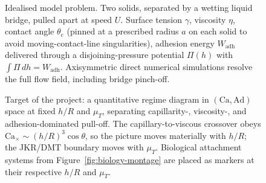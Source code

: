 \documentclass[11pt]{article}
\begin{document}
\begin{figure}[H]
    \begin{center}
        \caption{Idealised model problem. Two solids, separated by a wetting liquid bridge, pulled apart at speed $U$. Surface tension $\gamma$, viscosity $\eta$, contact angle $\theta_e$ (pinned at a prescribed radius $a$ on each solid to avoid moving-contact-line singularities), adhesion energy $W_{\mathrm{adh}}$ delivered through a disjoining-pressure potential $\Pi(h)$ with $\int \Pi\,dh = W_{\mathrm{adh}}$. Axisymmetric direct numerical simulations resolve the full flow field, including bridge pinch-off.}
        \label{fig:schematic}
    \end{center}
\end{figure}

\begin{figure}[H]
    \begin{center}
        \caption{Target of the project: a quantitative regime diagram in $(\mathrm{Ca}, \mathrm{Ad})$ space at fixed $h/R$ and $\mu_T$, separating capillarity-, viscosity-, and adhesion-dominated pull-off. The capillary-to-viscous crossover obeys $\mathrm{Ca}_\times \sim (h/R)^3 \cos\theta$, so the picture moves materially with $h/R$; the JKR/DMT boundary moves with $\mu_T$. Biological attachment systems from Figure~\ref{fig:biology-montage} are placed as markers at their respective $h/R$ and $\mu_T$.}
        \label{fig:regime}
    \end{center}
\end{figure}
\end{document}
